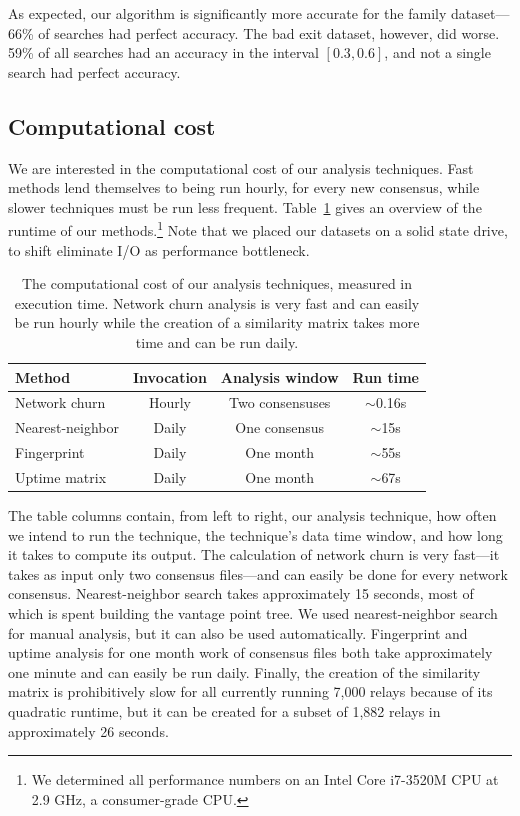 As expected, our algorithm is significantly more accurate for the family
dataset---66\% of searches had perfect accuracy.  The bad exit dataset, however,
did worse.  59\% of all searches had an accuracy in the interval $[0.3,0.6]$,
and not a single search had perfect accuracy.

\subsection{Computational cost}
\label{sec:performance}
We are interested in the computational cost of our analysis techniques.  Fast
methods lend themselves to being run hourly, for every new consensus, while
slower techniques must be run less frequent.  Table~\ref{tab:exp-deployment}
gives an overview of the runtime of our methods.\footnote{We determined all
performance numbers on an Intel Core i7-3520M CPU at 2.9 GHz, a consumer-grade
CPU.}  Note that we placed our datasets on a solid state drive, to shift
eliminate I/O as performance bottleneck.

\begin{table}[t]
	\small
	\centering
	\begin{tabular}{lccc}
	\textbf{Method} & \textbf{Invocation} & \textbf{Analysis window} & \textbf{Run time} \\
	\hline
	Network churn & Hourly & Two consensuses & $\sim$0.16s \\
	Nearest-neighbor & Daily & One consensus & $\sim$15s \\
	Fingerprint & Daily & One month & $\sim$55s \\
	Uptime matrix & Daily & One month & $\sim$67s \\
	\end{tabular}
	\caption{The computational cost of our analysis techniques, measured in
	execution time.  Network churn analysis is very fast and can easily be run
	hourly while the creation of a similarity matrix takes more time and can be
	run daily.}
	\label{tab:exp-deployment}
\end{table}

The table columns contain, from left to right, our analysis technique, how often
we intend to run the technique, the technique's data time window, and how long
it takes to compute its output.  The calculation of network churn is very
fast---it takes as input only two consensus files---and can easily be done for
every network consensus.  Nearest-neighbor search takes approximately 15
seconds, most of which is spent building the vantage point tree.  We used
nearest-neighbor search for manual analysis, but it can also be used
automatically.  Fingerprint and uptime analysis for one month work of consensus
files both take approximately one minute and can easily be run daily.  Finally,
the creation of the similarity matrix is prohibitively slow for all currently
running 7,000 relays because of its quadratic runtime, but it can be created for
a subset of 1,882 relays in approximately 26 seconds.
